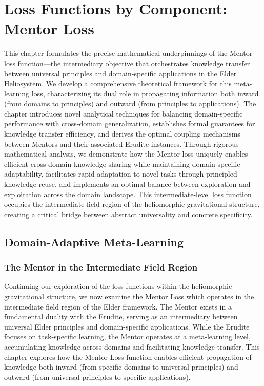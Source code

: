 \chapter{Loss Functions by Component: Mentor Loss}

\begin{tcolorbox}[colback=PureBlue!5!white,colframe=PureBlue!75!black,title=Chapter Summary]
This chapter formulates the precise mathematical underpinnings of the Mentor loss function—the intermediary objective that orchestrates knowledge transfer between universal principles and domain-specific applications in the Elder Heliosystem. We develop a comprehensive theoretical framework for this meta-learning loss, characterizing its dual role in propagating information both inward (from domains to principles) and outward (from principles to applications). The chapter introduces novel analytical techniques for balancing domain-specific performance with cross-domain generalization, establishes formal guarantees for knowledge transfer efficiency, and derives the optimal coupling mechanisms between Mentors and their associated Erudite instances. Through rigorous mathematical analysis, we demonstrate how the Mentor loss uniquely enables efficient cross-domain knowledge sharing while maintaining domain-specific adaptability, facilitates rapid adaptation to novel tasks through principled knowledge reuse, and implements an optimal balance between exploration and exploitation across the domain landscape. This intermediate-level loss function occupies the intermediate field region of the heliomorphic gravitational structure, creating a critical bridge between abstract universality and concrete specificity.
\end{tcolorbox}

\section{Domain-Adaptive Meta-Learning}

\subsection{The Mentor in the Intermediate Field Region}

Continuing our exploration of the loss functions within the heliomorphic gravitational structure, we now examine the Mentor Loss which operates in the intermediate field region of the Elder framework. The Mentor exists in a fundamental duality with the Erudite, serving as an intermediary between universal Elder principles and domain-specific applications. While the Erudite focuses on task-specific learning, the Mentor operates at a meta-learning level, accumulating knowledge across domains and facilitating knowledge transfer. This chapter explores how the Mentor Loss function enables efficient propagation of knowledge both inward (from specific domains to universal principles) and outward (from universal principles to specific applications).


